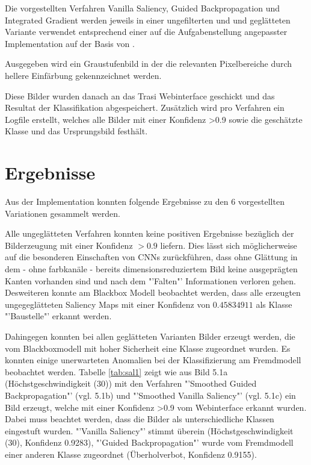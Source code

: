 Die vorgestellten Verfahren Vanilla Saliency\cite{simonyan_deep_2013}, Guided Backpropagation\cite{springenberg_striving_2014} und Integrated Gradient\cite{sundararajan_axiomatic_2017} werden jeweils in einer ungefilterten und und geglätteten Variante verwendet entsprechend einer auf die Aufgabenstellung angepasster Implementation auf der Basis von \cite{anh_implementations_2019}. 

Ausgegeben wird ein Graustufenbild in der die relevanten Pixelbereiche durch hellere Einfärbung gekennzeichnet werden.

Diese Bilder wurden danach an das Trasi Webinterface geschickt und das Resultat der Klassifikation abgespeichert. Zusätzlich wird pro Verfahren ein Logfile erstellt, welches alle Bilder mit einer Konfidenz >0.9 sowie die geschätzte Klasse und das Ursprungsbild festhält.

%
%
%
%

\section{Ergebnisse}

Aus der Implementation konnten folgende Ergebnisse zu den 6 vorgestellten Variationen gesammelt werden. 


Alle ungeglätteten Verfahren konnten keine positiven Ergebnisse bezüglich der Bilderzeugung mit einer Konfidenz $> 0.9$ liefern. Dies lässt sich möglicherweise auf die besonderen Einschaften von \acp{CNN} zurückführen, dass ohne Glättung in dem - ohne farbkanäle - bereits dimensionsreduziertem Bild keine ausgeprägten Kanten vorhanden sind und nach dem "'Falten"' Informationen verloren gehen. Desweiteren konnte am Blackbox Modell beobachtet werden, dass alle erzeugten ungegeglätteten Saliency Maps mit einer Konfidenz von $0.45834911$ als Klasse "'Baustelle"' erkannt werden.

Dahingegen konnten bei allen geglätteten Varianten Bilder erzeugt werden, die vom Blackboxmodell mit hoher Sicherheit eine Klasse zugeordnet wurden. Es konnten einige unerwarteten Anomalien bei der Klassifizierung am Fremdmodell beobachtet werden.  Tabelle \ref{tab:sal1} zeigt wie aus Bild 5.1a (Höchstgeschwindigkeit (30))  mit den Verfahren "'Smoothed Guided Backpropagation"' (vgl. 5.1b) und "'Smoothed Vanilla Saliency"' (vgl. 5.1c) ein Bild erzeugt, welche mit einer Konfidenz >0.9 vom Webinterface erkannt wurden. Dabei muss beachtet werden, dass die Bilder als unterschiedliche Klassen eingestuft wurden. "'Vanilla Saliency"' stimmt überein (Höchstgeschwindigkeit (30), Konfidenz 0.9283), "'Guided Backpropagation"' wurde vom Fremdmodell einer anderen Klasse zugeordnet (Überholverbot, Konfidenz 0.9155).


